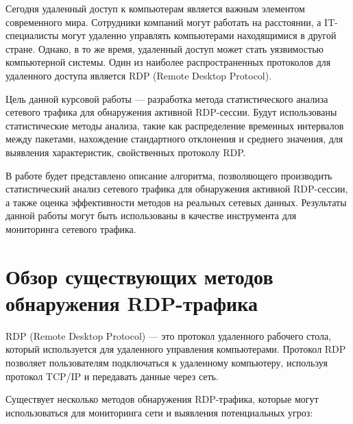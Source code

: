 \documentclass[bachelor, och, coursework]{SCWorks}
\begin{document}


\tableofcontents

\intro
Сегодня удаленный доступ к компьютерам является важным элементом современного мира. Сотрудники компаний могут работать на расстоянии, а 
IT-специалисты могут удаленно управлять компьютерами находящимися в другой стране. Однако, в то же время, удаленный доступ может стать 
уязвимостью компьютерной системы. Один из наиболее распространенных протоколов для удаленного доступа является RDP (Remote Desktop Protocol). 

Цель данной курсовой работы --- разработка метода статистического анализа сетевого трафика для обнаружения активной RDP-сессии. 
Будут использованы статистические методы анализа, такие как распределение временных интервалов между пакетами, нахождение стандартного отклонения и 
среднего значения, для выявления характеристик, свойственных протоколу RDP.

В работе будет представлено описание алгоритма, позволяющего производить статистический анализ сетевого трафика для обнаружения активной 
RDP-сессии, а также оценка эффективности методов на реальных сетевых данных. 
Результаты данной работы могут быть использованы в качестве инструмента для мониторинга сетевого трафика.

\section{Обзор существующих методов обнаружения RDP-трафика}

RDP (Remote Desktop Protocol) --- это протокол удаленного рабочего стола, который используется для удаленного управления компьютерами. 
Протокол RDP позволяет пользователям подключаться к удаленному компьютеру, используя протокол TCP/IP и передавать данные через сеть.

Существует несколько методов обнаружения RDP-трафика, которые могут использоваться для мониторинга сети и выявления потенциальных угроз:
\end{document}
